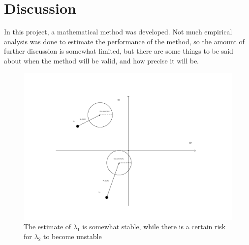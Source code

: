 \chapter{Discussion}
\label{chp:discussion}
In this project, a mathematical method was developed. Not much empirical analysis was done to estimate the performance of the method, so the amount of further discussion is somewhat limited, but there are some things to be said about when the method will be valid, and how precise it will be. 

\begin{figure}
 \centering
 \includegraphics[width=\textwidth,height=\textheight,keepaspectratio]{Figures/Pole_changes.pdf}
 \caption{The estimate of $\lambda_1$ is somewhat stable, while there is a certain risk for $\lambda_2$ to become unstable}
 \label{fig:figure_of_the_method}
\end{figure}{}


